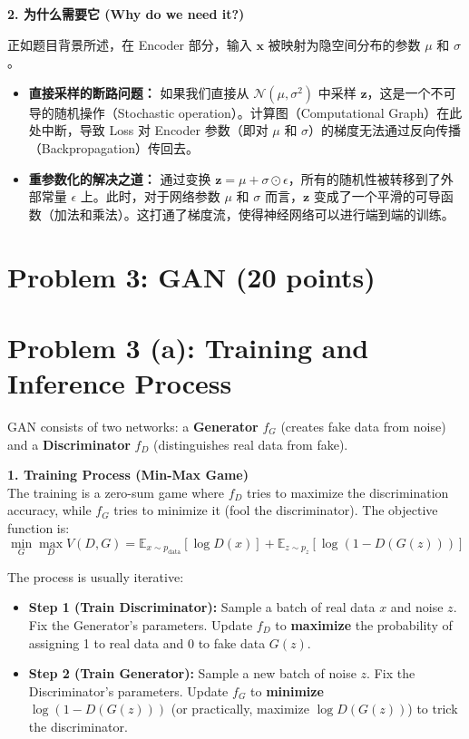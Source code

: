 \documentclass[12pt]{article}
\begin{document}
\textbf{2. 为什么需要它 (Why do we need it?)}

正如题目背景所述，在 Encoder 部分，输入 $\mathbf{x}$ 被映射为隐空间分布的参数 $\mu$ 和 $\sigma$。

\begin{itemize}
    \item \textbf{直接采样的断路问题：} 如果我们直接从 $\mathcal{N}(\mu, \sigma^2)$ 中采样 $\mathbf{z}$，这是一个不可导的随机操作（Stochastic operation）。计算图（Computational Graph）在此处中断，导致 Loss 对 Encoder 参数（即对 $\mu$ 和 $\sigma$）的梯度无法通过反向传播（Backpropagation）传回去。
    
    \item \textbf{重参数化的解决之道：} 通过变换 $\mathbf{z} = \mu + \sigma \odot \epsilon$，所有的随机性被转移到了外部常量 $\epsilon$ 上。此时，对于网络参数 $\mu$ 和 $\sigma$ 而言，$\mathbf{z}$ 变成了一个平滑的可导函数（加法和乘法）。这打通了梯度流，使得神经网络可以进行端到端的训练。

\end{itemize}

\section*{Problem 3: GAN (20 points)}

\section*{Problem 3 (a): Training and Inference Process}

GAN consists of two networks: a \textbf{Generator} $f_G$ (creates fake data from noise) and a \textbf{Discriminator} $f_D$ (distinguishes real data from fake).

\textbf{1. Training Process (Min-Max Game)} \\
The training is a zero-sum game where $f_D$ tries to maximize the discrimination accuracy, while $f_G$ tries to minimize it (fool the discriminator).
The objective function is:
\[
    \min_{G} \max_{D} V(D, G) = \mathbb{E}_{x \sim p_{\text{data}}} [\log D(x)] + \mathbb{E}_{z \sim p_z} [\log (1 - D(G(z)))]
\]

The process is usually iterative:
\begin{itemize}
    \item \textbf{Step 1 (Train Discriminator):} Sample a batch of real data $x$ and noise $z$. Fix the Generator's parameters. Update $f_D$ to \textbf{maximize} the probability of assigning 1 to real data and 0 to fake data $G(z)$.
    \item \textbf{Step 2 (Train Generator):} Sample a new batch of noise $z$. Fix the Discriminator's parameters. Update $f_G$ to \textbf{minimize} $\log(1 - D(G(z)))$ (or practically, maximize $\log D(G(z))$) to trick the discriminator.
\end{itemize}
\end{document}
